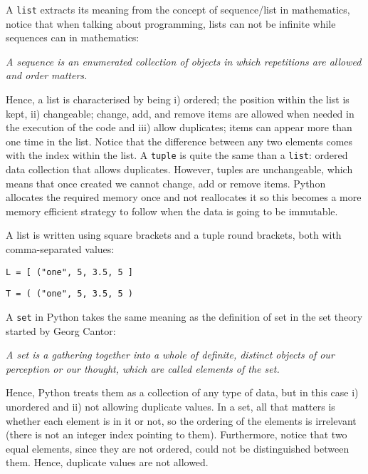 

A \texttt{list} extracts its meaning from the concept of sequence/list in mathematics, notice that when talking about programming, lists can not be infinite while sequences can in mathematics:

\textit{A sequence is an enumerated collection of objects in which repetitions are allowed and order matters.}

Hence, a list is characterised by being i) ordered; the position within the list is kept, ii) changeable; change, add, and remove items are allowed when needed in the execution of the code and iii) allow duplicates; items can appear more than one time in the list. Notice that the difference between any two elements comes with the index within the list.
A \texttt{tuple} is quite the same than a \texttt{list}: ordered data collection that allows duplicates. 
However, tuples are unchangeable, which means that once created we cannot change, add or remove items. 
Python allocates the required memory once and not reallocates it so this becomes a more memory efficient strategy to follow when the data is going to be immutable.

A list is written using square brackets and a tuple round brackets, both with comma-separated values:
\begin{verbatim}
L = [ ("one", 5, 3.5, 5 ]
\end{verbatim}
\begin{verbatim}
T = ( ("one", 5, 3.5, 5 )
\end{verbatim}

A \texttt{set} in Python takes the same meaning as the definition of set in the set theory started by Georg Cantor:

\textit{A set is a gathering together into a whole of definite, distinct objects of our perception or our thought, which are called elements of the set.}

Hence, Python treats them as a collection of any type of data, but in this case i) unordered and ii) not allowing duplicate values. 
In a set, all that matters is whether each element is in it or not, so the ordering of the elements is irrelevant (there is not an integer index pointing to them).
Furthermore, notice that two equal elements, since they are not ordered, could not be distinguished between them. Hence, duplicate values are not allowed. 

